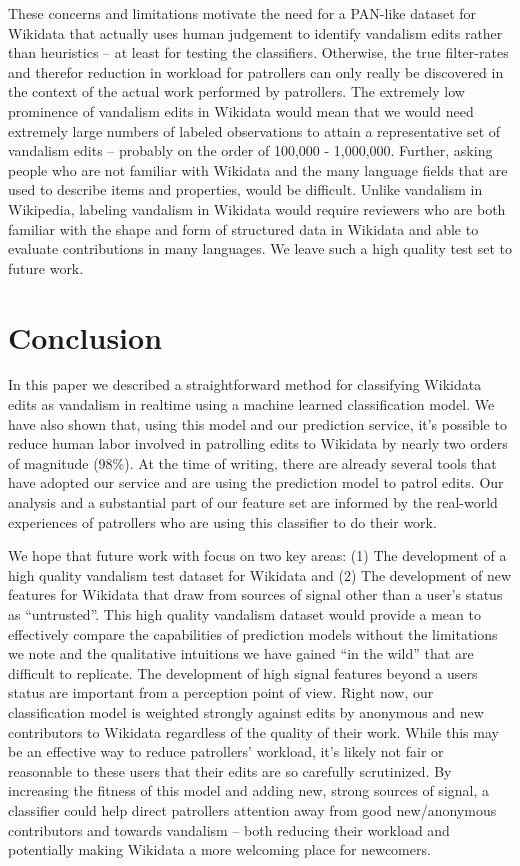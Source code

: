 \documentclass{sig-alternate}
\begin{document}
These concerns and limitations motivate the need for a PAN-like dataset for Wikidata that actually uses human judgement to identify vandalism edits rather than heuristics -- at least for testing the classifiers. Otherwise, the true filter-rates and therefor reduction in workload for patrollers can only really be discovered in the context of the actual work performed by patrollers. The extremely low prominence of vandalism edits in Wikidata would mean that we would need extremely large numbers of labeled observations to attain a representative set of vandalism edits -- probably on the order of 100,000 - 1,000,000. Further, asking people who are not familiar with Wikidata and the many language fields that are used to describe items and properties, would be difficult. Unlike vandalism in Wikipedia, labeling vandalism in Wikidata would require reviewers who are both familiar with the shape and form of structured data in Wikidata and able to evaluate contributions in many languages. We leave such a high quality test set to future work.

\section{Conclusion}
In this paper we described a straightforward method for classifying Wikidata edits as vandalism in realtime using a machine learned classification model. We have also shown that, using this model and our prediction service, it's possible to reduce human labor involved in patrolling edits to Wikidata by nearly two orders of magnitude (98\%). At the time of writing, there are already several tools that have adopted our service and are using the prediction model to patrol edits. Our analysis and a substantial part of our feature set are informed by the real-world experiences of patrollers who are using this classifier to do their work.

We hope that future work with focus on two key areas: (1) The development of a high quality vandalism test dataset for Wikidata and (2) The development of new features for Wikidata that draw from sources of signal other than a user's status as ``untrusted''. This high quality vandalism dataset would provide a mean to effectively compare the capabilities of prediction models without the limitations we note and the qualitative intuitions we have gained ``in the wild'' that are difficult to replicate. The development of high signal features beyond a users status are important from a perception point of view. Right now, our classification model is weighted strongly against edits by anonymous and new contributors to Wikidata regardless of the quality of their work.  While this may be an effective way to reduce patrollers' workload, it's likely not fair or reasonable to these users that their edits are so carefully scrutinized. By increasing the fitness of this model and adding new, strong sources of signal, a classifier could help direct patrollers attention away from good new/anonymous contributors and towards vandalism -- both reducing their workload and potentially making Wikidata a more welcoming place for newcomers.
\end{document}
